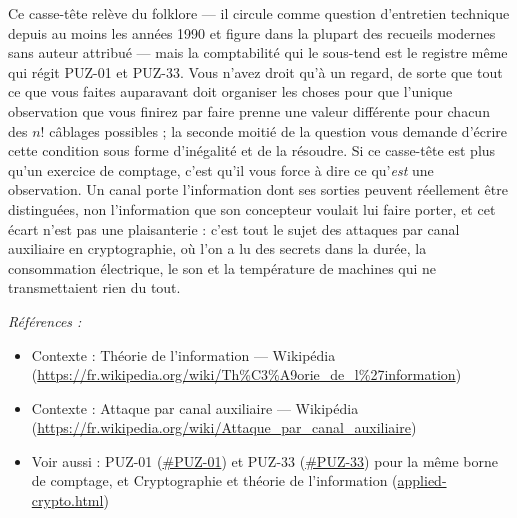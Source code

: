 \documentclass[11pt]{article}
\newenvironment{refs}{\par\small\noindent\emph{Références :}\begin{itemize}\setlength\itemsep{0pt}}{\end{itemize}\normalsize}
\begin{document}
\noindent Ce casse-tête relève du folklore --- il circule comme question d'entretien
technique depuis au moins les années 1990 et figure dans la plupart des recueils modernes
sans auteur attribué --- mais la comptabilité qui le sous-tend est le registre même qui régit
PUZ-01 et PUZ-33. Vous n'avez droit qu'à un regard, de sorte que tout ce que vous faites
auparavant doit organiser les choses pour que l'unique observation que vous finirez par faire
prenne une valeur différente pour chacun des $ n! $ câblages possibles ; la seconde moitié
de la question vous demande d'écrire cette condition sous forme d'inégalité et de la
résoudre. Si ce casse-tête est plus qu'un exercice de comptage, c'est qu'il vous force à dire
ce qu'\textit{est} une observation. Un canal porte l'information dont ses sorties peuvent
réellement être distinguées, non l'information que son concepteur voulait lui faire porter,
et cet écart n'est pas une plaisanterie : c'est tout le sujet des attaques par canal
auxiliaire en cryptographie, où l'on a lu des secrets dans la durée, la consommation
électrique, le son et la température de machines qui ne transmettaient rien du tout.

\begin{refs}
\item Contexte : Théorie de l'information --- Wikipédia (\url{https://fr.wikipedia.org/wiki/Th%C3%A9orie_de_l%27information})
\item Contexte : Attaque par canal auxiliaire --- Wikipédia (\url{https://fr.wikipedia.org/wiki/Attaque_par_canal_auxiliaire})
\item Voir aussi : PUZ-01 (\url{#PUZ-01}) et PUZ-33 (\url{#PUZ-33}) pour la même borne de comptage, et Cryptographie et théorie de l'information (\url{applied-crypto.html})
\end{refs}

\bigskip
\end{document}
